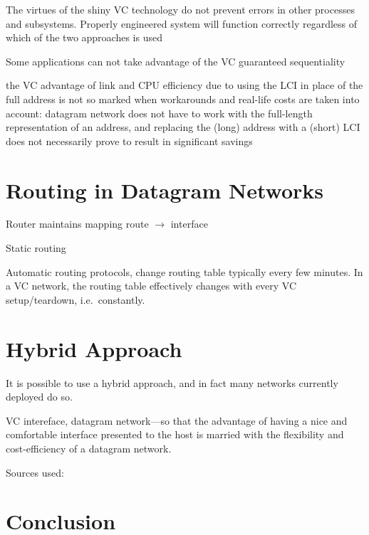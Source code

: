 \documentclass[10pt]{report}
\begin{document}
The virtues of the shiny VC technology do not prevent errors in other processes and subsystems.  Properly engineered system will function correctly regardless of which of the two approaches is used \cite[p161]{russell}

Some applications can not take advantage of the VC guaranteed sequentiality \cite[p161]{russell}

the VC advantage of link and CPU efficiency due to using the LCI in place of the full address is not so marked when workarounds and real-life costs are taken into account: datagram network does not have to work with the full-length representation of an address, and replacing the (long) address with a (short) LCI does not necessarily prove to result in significant savings \cite[p161]{russell}

\section{Routing in Datagram Networks}

Router maintains mapping route $\rightarrow$ interface

Static routing

Automatic routing protocols, change routing table typically every few minutes. \cite{xxx}  In a VC network, the routing table effectively changes with every VC setup/teardown, i.e.\ constantly.

\section{Hybrid Approach}

It is possible to use a hybrid approach, and in fact many networks currently deployed do so.

VC intereface, datagram network---so that the advantage of having a nice and comfortable interface presented to the host is married with the flexibility and cost-efficiency of a datagram network.


Sources used:
    \cite{kurose}
    \cite{russell}
    \cite{stallings}
    \cite{slides-lecture-2}
    \cite{slides-lecture-6}
    \cite{crowcroft}

\section{Conclusion}



\end{document}
